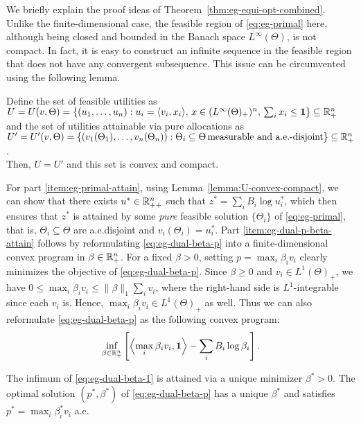 We briefly explain the proof ideas of Theorem~\ref{thm:eg-equi-opt-combined}. 
Unlike the finite-dimensional case, the feasible region of \eqref{eq:eg-primal} here, although being closed and bounded in the Banach space $L^\infty(\Theta)$, is not compact. In fact, it is easy to construct an infinite sequence in the feasible region that does not have any convergent subsequence.
This issue can be circumvented using the following lemma.
\begin{lemma}
	Define the set of feasible utilities as\\
	$U = U(v, \Theta) = \left\{ (u_1, \dots, u_n): u_i = \langle v_i, x_i\rangle,\, x\in (L^\infty(\Theta)_+)^n,\, \sum_i x_i \leq \mathbf{1} \right\} \subseteq \mathbb{R}_+^n \label{eq:def-U-U(v,Theta)}$\\
	and the set of utilities attainable via pure allocations as\\
	$U' = U'(v, \Theta) = \left\{ (v_1(\Theta_1), \dots, v_n(\Theta_n)): \Theta_i \subseteq \Theta\, \text{measurable and a.e.-disjoint} \right\} \subseteq \mathbb{R}_+^n$.\\
	Then, $U = U'$ and this set is convex and compact.
	\label{lemma:U-convex-compact}
\end{lemma}
For part \ref{item:eg-primal-attain}, using Lemma~\ref{lemma:U-convex-compact}, we can show that there exists $u^* \in \mathbb{R}_{++}^n$ such that $z^* = \sum_i B_i \log u^*_i$, which then ensures that $z^*$ is attained by some \emph{pure} feasible solution $\{\Theta_i\}$ of \eqref{eq:eg-primal}, that is, $\Theta_i\subseteq \Theta$ are a.e.disjoint and $v_i(\Theta_i) = u^*_i$. Part \ref{item:eg-dual-p-beta-attain} follows by reformulating \eqref{eq:eg-dual-beta-p} into a finite-dimensional convex program in $\beta\in \mathbb{R}_+^n$. 
For a  fixed $\beta>0$, setting $p = \max_i \beta_i v_i$ clearly minimizes the objective of \eqref{eq:eg-dual-beta-p}. 
Since $\beta\geq 0$ and $v_i \in L^1(\Theta)_+$, we have
$ 0 \leq \max_i \beta_i v_i \leq \|\beta\|_1 \sum_i v_i$,
where the right-hand side is $L^1$-integrable since each $v_i$ is. Hence, $\max_i \beta_i v_i \in L^1(\Theta)_+$ as well. 
Thus we can also reformulate \eqref{eq:eg-dual-beta-p} as the following convex program:
\begin{align}
\inf_{\beta\in \mathbb{R}_+^n} \left[\left \langle \max_i \beta_i v_i, \mathbf{1} \right \rangle - \sum_i B_i \log \beta_i\right].  \label{eq:eg-dual-beta-1}
\end{align} 
\begin{lemma}
	The infimum of \eqref{eq:eg-dual-beta-1} is attained via a unique minimizer $\beta^* > 0$. The optimal solution $(p^*, \beta^*)$ of \eqref{eq:eg-dual-beta-p} has a unique $\beta^*$ and satisfies $p^* = \max_i \beta^*_i v_i$ a.e.
	\label{lemma:beta-dual-attain}
\end{lemma}
